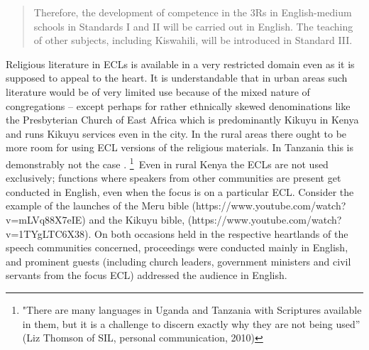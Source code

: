 \documentclass[output=paper,colorlinks,citecolor=brown]{langscibook}
\begin{document}
\begin{quotation}
Therefore, the development of competence in the 3Rs in English-medium schools in Standards I and II will be carried out in English. The teaching of other subjects, including Kiswahili, will be introduced in Standard III. \hfill \citep[2]{Tanzania-Government2016} 
\end{quotation}{}

Religious literature in ECLs is available in a very restricted domain even as it is supposed to appeal to the heart. It is understandable that in urban areas such literature would be of very limited use because of the mixed nature of congregations – except perhaps for rather ethnically skewed denominations like the Presbyterian Church of East Africa which is predominantly Kikuyu in Kenya and runs Kikuyu services even in the city. In the rural areas there ought to be more room for using ECL versions of the religious materials. In Tanzania this is demonstrably not the case \citep{Madumulla2007, MuzaleRugemalira2008, Rugemalira2013}. \footnote{"There are many languages in Uganda and Tanzania with Scriptures available in them, but it is a challenge to discern exactly why they are not being used” (Liz Thomson of SIL, personal communication, 2010)}~Even in rural Kenya the ECLs are not used exclusively; functions where speakers from other communities are present get conducted in English, even when the focus is on a particular ECL. Consider the example of the launches of the Meru bible (https://www.youtube.com/watch?v=mLVq88X7eIE) and the Kikuyu bible, (https://www.youtube.com/watch?v=1TYgLTC6X38). On both occasions held in the respective heartlands of the speech communities concerned, proceedings were conducted mainly in English, and prominent guests (including church leaders, government ministers and civil servants from the focus ECL) addressed the audience in English. 
\end{document}
